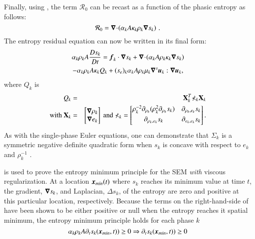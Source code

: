 \documentclass[preprint,10pt]{elsarticle}
\begin{document}
Finally, using , the term $\mathcal{R}_0$ can be recast as a function of the phasic entropy as follows: 
%
\begin{equation}
\mathcal{R}_0 = \boldsymbol\nabla\! \cdot \! \left( \alpha_k A \kappa_k \rho_k \boldsymbol\nabla s_k \right) \,.
\end{equation}
%
The entropy residual equation can now be written in its final form:
%
\begin{multline}\label{eq:ent-res-7-eqn-diss-terms3}
\alpha_k \rho_k A \frac{Ds_k}{Dt} =  \boldsymbol f_k \cdot \boldsymbol\nabla s_k + \boldsymbol\nabla\! \cdot \! \left( \alpha_k A \rho_k \kappa_k  \boldsymbol\nabla s_k \right)  \\
- \alpha_k \rho_k A \kappa_k Q_k + (s_e)_k \alpha_k A \rho_k \mu_k \boldsymbol\nabla^s \boldsymbol u_k : \boldsymbol\nabla \boldsymbol u_k,
\end{multline}
%
where $Q_k$ is 
%
\begin{eqnarray}
Q_k &=& \mathbf{X}^T_k \mathbb{\Sigma}_k \mathbf{X}_k \nonumber \\
\text{with } \mathbf{X}_k &=& \begin{bmatrix}
\boldsymbol\nabla \rho_k \\
\boldsymbol\nabla e_k 
\end{bmatrix}
\text{ and } \mathbb{\Sigma}_k = \begin{bmatrix}
       \rho_k^{-2} \partial_{\rho_k} (\rho^2_k \partial_{\rho_k} s_k) & \partial_{\rho_k,e_k} s_k  \\[0.3em]
       \partial_{\rho_k,e_k} s_k & \partial_{e_k,e_k} s_k           \\[0.3em]
     \end{bmatrix}. \nonumber 
\end{eqnarray}
%
As with the single-phase Euler equations, one can demonstrate that $\mathbb{\Sigma}_k$ is a symmetric negative definite quadratic form 
when $s_k$ is concave with respect to $e_k$ and $\rho_k^{-1}$  \cite{jlg, Marco_paper_low_mach}.

 is used to prove the entropy minimum principle for the SEM \emph{with} viscous regularization. At a location $\boldsymbol x_{min}(t)$ where $s_k$ reaches its minimum value at time $t$, the gradient, $\boldsymbol\nabla s_k$, and Laplacian, $\Delta s_k$,  of the entropy are zero and positive at this particular location, respectively. %
Because the terms on the right-hand-side of  have been shown to be either positive or null when the entropy reaches it spatial minimum, the entropy minimum principle holds for each phase $k$
%
\begin{equation}\label{eq:ent-res-7-eqn-diss-terms4}
\alpha_k \rho_k A \partial_t s_k(\boldsymbol x_{min},t)) \geq 0 \Rightarrow \partial_t s_k(\boldsymbol x_{min},t)) \geq 0 \nonumber
\end{equation}
%
\end{document}
